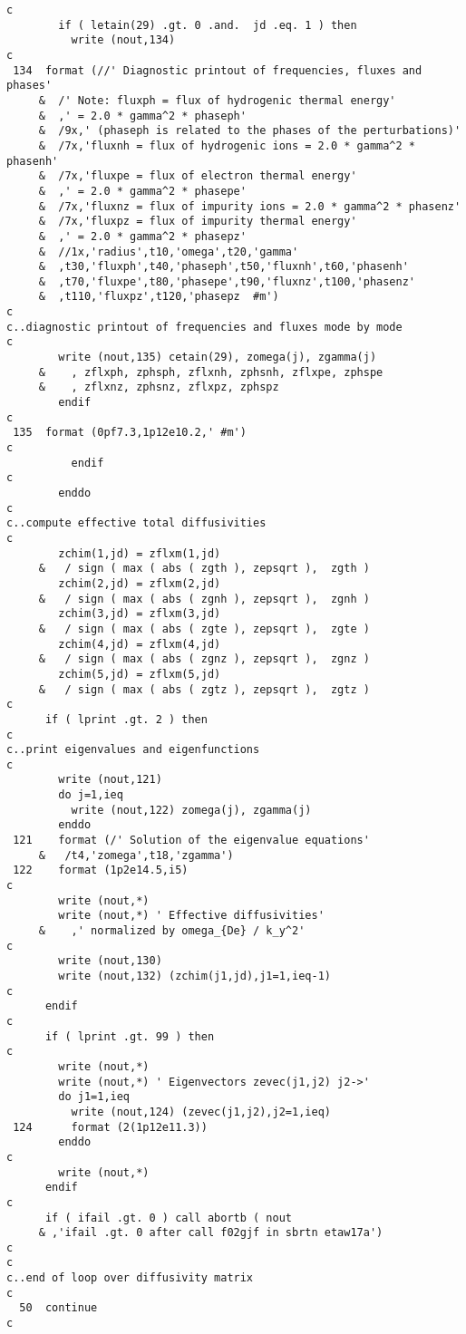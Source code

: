 \begin{verbatim}
c
        if ( letain(29) .gt. 0 .and.  jd .eq. 1 ) then
          write (nout,134)
c
 134  format (//' Diagnostic printout of frequencies, fluxes and phases'
     &  /' Note: fluxph = flux of hydrogenic thermal energy'
     &  ,' = 2.0 * gamma^2 * phaseph'
     &  /9x,' (phaseph is related to the phases of the perturbations)'
     &  /7x,'fluxnh = flux of hydrogenic ions = 2.0 * gamma^2 * phasenh'
     &  /7x,'fluxpe = flux of electron thermal energy'
     &  ,' = 2.0 * gamma^2 * phasepe'
     &  /7x,'fluxnz = flux of impurity ions = 2.0 * gamma^2 * phasenz'
     &  /7x,'fluxpz = flux of impurity thermal energy'
     &  ,' = 2.0 * gamma^2 * phasepz'
     &  //1x,'radius',t10,'omega',t20,'gamma'
     &  ,t30,'fluxph',t40,'phaseph',t50,'fluxnh',t60,'phasenh'
     &  ,t70,'fluxpe',t80,'phasepe',t90,'fluxnz',t100,'phasenz'
     &  ,t110,'fluxpz',t120,'phasepz  #m')
c
c..diagnostic printout of frequencies and fluxes mode by mode
c
        write (nout,135) cetain(29), zomega(j), zgamma(j)
     &    , zflxph, zphsph, zflxnh, zphsnh, zflxpe, zphspe
     &    , zflxnz, zphsnz, zflxpz, zphspz
        endif
c
 135  format (0pf7.3,1p12e10.2,' #m')
c
          endif
c
        enddo
c
c..compute effective total diffusivities
c
        zchim(1,jd) = zflxm(1,jd)
     &   / sign ( max ( abs ( zgth ), zepsqrt ),  zgth )
        zchim(2,jd) = zflxm(2,jd)
     &   / sign ( max ( abs ( zgnh ), zepsqrt ),  zgnh )
        zchim(3,jd) = zflxm(3,jd)
     &   / sign ( max ( abs ( zgte ), zepsqrt ),  zgte )
        zchim(4,jd) = zflxm(4,jd)
     &   / sign ( max ( abs ( zgnz ), zepsqrt ),  zgnz )
        zchim(5,jd) = zflxm(5,jd)
     &   / sign ( max ( abs ( zgtz ), zepsqrt ),  zgtz )
c
      if ( lprint .gt. 2 ) then
c
c..print eigenvalues and eigenfunctions
c
        write (nout,121)
        do j=1,ieq
          write (nout,122) zomega(j), zgamma(j)
        enddo
 121    format (/' Solution of the eigenvalue equations'
     &   /t4,'zomega',t18,'zgamma')
 122    format (1p2e14.5,i5)
c
        write (nout,*)
        write (nout,*) ' Effective diffusivities'
     &    ,' normalized by omega_{De} / k_y^2'
c
        write (nout,130)
        write (nout,132) (zchim(j1,jd),j1=1,ieq-1)
c
      endif
c
      if ( lprint .gt. 99 ) then
c
        write (nout,*)
        write (nout,*) ' Eigenvectors zevec(j1,j2) j2->'
        do j1=1,ieq
          write (nout,124) (zevec(j1,j2),j2=1,ieq)
 124      format (2(1p12e11.3))
        enddo
c
        write (nout,*)
      endif
c
      if ( ifail .gt. 0 ) call abortb ( nout
     & ,'ifail .gt. 0 after call f02gjf in sbrtn etaw17a')
c
c
c..end of loop over diffusivity matrix
c
  50  continue
c
\end{verbatim}


